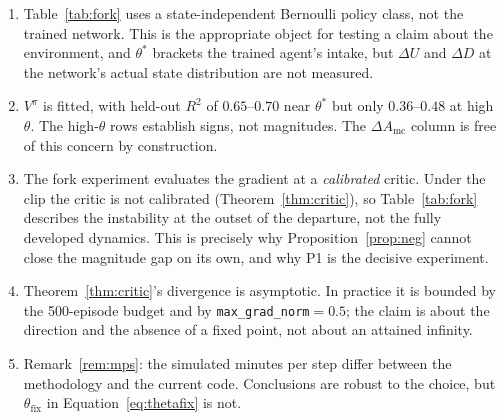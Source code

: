 \documentclass[11pt]{article}
\theoremstyle{definition}
\begin{document}
\begin{enumerate}
\item Table~\ref{tab:fork} uses a state-independent Bernoulli policy class,
not the trained network. This is the appropriate object for testing a claim
about the environment, and $\theta^\ast$ brackets the trained agent's intake,
but $\Delta U$ and $\Delta D$ at the network's actual state distribution are
not measured.
\item $V^\pi$ is fitted, with held-out $R^2$ of $0.65$--$0.70$ near
$\theta^\ast$ but only $0.36$--$0.48$ at high $\theta$. The high-$\theta$ rows
establish signs, not magnitudes. The $\Delta A_{\mathrm{mc}}$ column is free
of this concern by construction.
\item The fork experiment evaluates the gradient at a \emph{calibrated}
critic. Under the clip the critic is not calibrated (Theorem~\ref{thm:critic}),
so Table~\ref{tab:fork} describes the instability at the outset of the
departure, not the fully developed dynamics. This is precisely why
Proposition~\ref{prop:neg} cannot close the magnitude gap on its own, and why
P1 is the decisive experiment.
\item Theorem~\ref{thm:critic}'s divergence is asymptotic. In practice it is
bounded by the 500-episode budget and by \texttt{max\_grad\_norm}$=0.5$; the
claim is about the direction and the absence of a fixed point, not about an
attained infinity.
\item Remark~\ref{rem:mps}: the simulated minutes per step differ between the
methodology and the current code. Conclusions are robust to the choice, but
$\theta_{\mathrm{fix}}$ in Equation~\eqref{eq:thetafix} is not.
\end{enumerate}
\end{document}
